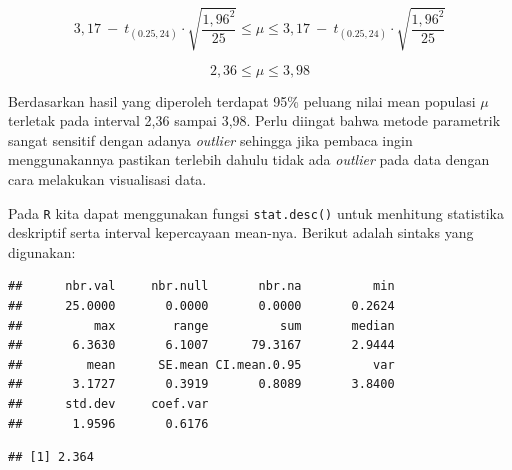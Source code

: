 \documentclass[]{book}
\newenvironment{Shaded}{\begin{snugshade}}{\end{snugshade}}
\newcommand{\KeywordTok}[1]{\textcolor[rgb]{0.13,0.29,0.53}{\textbf{#1}}}
\newcommand{\DecValTok}[1]{\textcolor[rgb]{0.00,0.00,0.81}{#1}}
\newcommand{\CommentTok}[1]{\textcolor[rgb]{0.56,0.35,0.01}{\textit{#1}}}
\newcommand{\OperatorTok}[1]{\textcolor[rgb]{0.81,0.36,0.00}{\textbf{#1}}}
\newcommand{\NormalTok}[1]{#1}
\begin{document}
\[
  3,17\ -\ t_{\left(0.25,24\right)}\cdot\sqrt{\frac{1,96^2}{25}}\le\mu\le3,17\ -\ t_{\left(0.25,24\right)}\cdot\sqrt{\frac{1,96^2}{25}}
\]

\[
  2,36\le\mu\le3,98
\]

Berdasarkan hasil yang diperoleh terdapat 95\% peluang nilai mean
populasi \(\mu\) terletak pada interval 2,36 sampai 3,98. Perlu diingat
bahwa metode parametrik sangat sensitif dengan adanya \emph{outlier}
sehingga jika pembaca ingin menggunakannya pastikan terlebih dahulu
tidak ada \emph{outlier} pada data dengan cara melakukan visualisasi
data.

Pada \texttt{R} kita dapat menggunakan fungsi \texttt{stat.desc()} untuk
menhitung statistika deskriptif serta interval kepercayaan mean-nya.
Berikut adalah sintaks yang digunakan:

\begin{Shaded}
\end{Shaded}

\begin{verbatim}
##      nbr.val     nbr.null       nbr.na          min 
##      25.0000       0.0000       0.0000       0.2624 
##          max        range          sum       median 
##       6.3630       6.1007      79.3167       2.9444 
##         mean      SE.mean CI.mean.0.95          var 
##       3.1727       0.3919       0.8089       3.8400 
##      std.dev     coef.var 
##       1.9596       0.6176
\end{verbatim}

\begin{Shaded}
\end{Shaded}

\begin{verbatim}
## [1] 2.364
\end{verbatim}

\begin{Shaded}
\end{Shaded}
\end{document}
